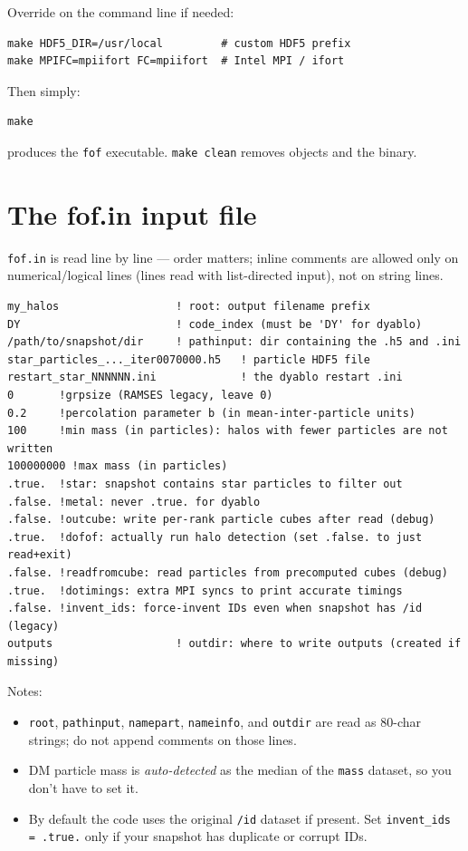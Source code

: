 \documentclass[11pt,a4paper]{article}
\begin{document}
\noindent
Override on the command line if needed:
\begin{lstlisting}
make HDF5_DIR=/usr/local         # custom HDF5 prefix
make MPIFC=mpiifort FC=mpiifort  # Intel MPI / ifort
\end{lstlisting}

Then simply:
\begin{lstlisting}
make
\end{lstlisting}
produces the \texttt{fof} executable. \texttt{make clean} removes objects and the binary.

\section{The fof.in input file}

\texttt{fof.in} is read line by line --- order matters; inline comments are
allowed only on numerical/logical lines (lines read with list-directed input),
not on string lines.

\begin{lstlisting}
my_halos                  ! root: output filename prefix
DY                        ! code_index (must be 'DY' for dyablo)
/path/to/snapshot/dir     ! pathinput: dir containing the .h5 and .ini
star_particles_..._iter0070000.h5   ! particle HDF5 file
restart_star_NNNNNN.ini             ! the dyablo restart .ini
0       !grpsize (RAMSES legacy, leave 0)
0.2     !percolation parameter b (in mean-inter-particle units)
100     !min mass (in particles): halos with fewer particles are not written
100000000 !max mass (in particles)
.true.  !star: snapshot contains star particles to filter out
.false. !metal: never .true. for dyablo
.false. !outcube: write per-rank particle cubes after read (debug)
.true.  !dofof: actually run halo detection (set .false. to just read+exit)
.false. !readfromcube: read particles from precomputed cubes (debug)
.true.  !dotimings: extra MPI syncs to print accurate timings
.false. !invent_ids: force-invent IDs even when snapshot has /id (legacy)
outputs                   ! outdir: where to write outputs (created if missing)
\end{lstlisting}

\noindent
Notes:
\begin{itemize}\itemsep0pt
  \item \texttt{root}, \texttt{pathinput}, \texttt{namepart}, \texttt{nameinfo},
        and \texttt{outdir} are read as 80-char strings; do not append comments
        on those lines.
  \item DM particle mass is \emph{auto-detected} as the median of the
        \texttt{mass} dataset, so you don't have to set it.
  \item By default the code uses the original \texttt{/id} dataset if present.
        Set \texttt{invent\_ids = .true.} only if your snapshot has duplicate
        or corrupt IDs.
\end{itemize}
\end{document}
